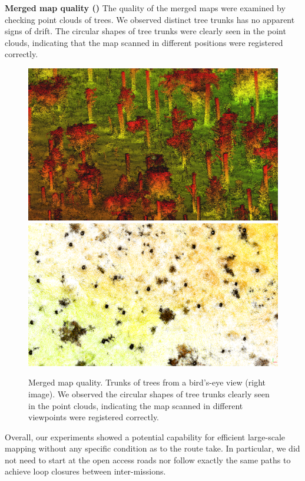 \noindent\textbf{Merged map quality ()}\hspace{0.5em} The quality of the merged maps were examined by checking point clouds of trees. We observed distinct tree trunks has no apparent signs of drift. The circular shapes of tree trunks were clearly seen in the point clouds, indicating that the map scanned in different positions were registered correctly. 
\begin{figure}[htbp]
  \centering
  \includegraphics[width=0.49\columnwidth]{pics/exp_3_offline_pointclouds_trunk.png}
  \includegraphics[width=0.49\columnwidth]{pics/exp_3_offline_pointclouds_trunk_BV3.png}
  \caption{Merged map quality. Trunks of trees from a bird's-eye view (right image). We observed the circular shapes of tree trunks clearly seen in the point clouds, indicating the map scanned in different viewpoints were registered correctly.}
  \label{fig:truk_of_trees}
\end{figure}

Overall, our experiments showed a potential capability for efficient large-scale mapping without any specific condition as to the route take. In particular, we did not need to start at the open access roads nor follow exactly the same paths to achieve loop closures between inter-missions. 




